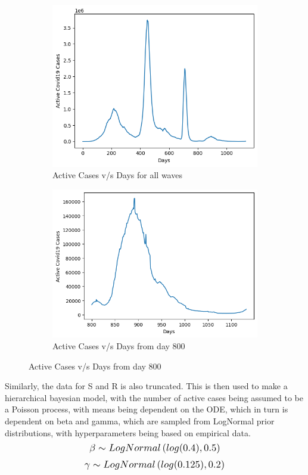 \documentclass[letterpaper,12pt]{report}
\begin{document}
\begin{figure}[H]
\begin{subfigure}{0.5\textwidth}
\hspace{-25pt}\includegraphics[scale=0.62]{I.png}
\caption{Active Cases v/s Days for all waves}
\end{subfigure}
\begin{subfigure}{0.5\textwidth}
\includegraphics[scale=0.62]{I_new.png}
\caption{Active Cases v/s Days from day 800}
\end{subfigure}
\end{figure}

\noindent
Similarly, the data for S and R is also truncated. This is then used to make a hierarchical bayesian model, with the number of active cases being assumed to be a Poisson process, with means being dependent on the ODE, which in turn is dependent on beta and gamma, which are sampled from LogNormal prior distributions, with hyperparameters being based on empirical data.
\begin{equation*}
    \scalebox{1.2}{$\beta \sim LogNormal\left (log(0.4), 0.5 \right )$}
\end{equation*}
\begin{equation*}
    \scalebox{1.2}{$\gamma \sim LogNormal\left (log(0.125), 0.2 \right )$}
\end{equation*}
\end{document}
